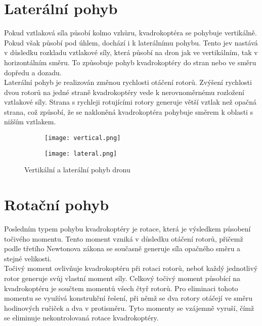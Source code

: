 \documentclass[12pt]{report}
\begin{document}
\section[Laterální pohyb]{Laterální pohyb}
Pokud vztlaková síla působí kolmo vzhůru, kvadrokoptéra se pohybuje vertikálně. Pokud však působí pod úhlem, dochází i k laterálnímu pohybu. Tento jev nastává v důsledku rozkladu vztlakové síly, která působí na dron jak ve vertikálním, tak v horizontálním směru. To způsobuje pohyb kvadrokoptéry do stran nebo ve směru dopředu a dozadu.\\
Laterální pohyb je realizován změnou rychlosti otáčení rotorů. Zvýšení rychlosti dvou rotorů na jedné straně kvadrokoptéry vede k nerovnoměrnému rozložení vztlakové síly. Strana s rychleji rotujícími rotory generuje větší vztlak než opačná strana, což způsobí, že se nakloněná kvadrokoptéra pohybuje směrem k oblasti s nižším vztlakem.

\begin{figure}[H]
    \begin{subfigure}{0.45\linewidth}
        \centering
        \texttt{[image: vertical.png]}
    \end{subfigure}
    \hfill
    \begin{subfigure}{0.45\linewidth}
        \texttt{[image: lateral.png]}
    \end{subfigure}
    \caption{Vertikální a laterální pohyb dronu \cite{nasa}}
    \label{fig:batteries}
\end{figure}

\section[Rotační pohyb]{Rotační pohyb}
Posledním typem pohybu kvadrokoptéry je rotace, která je výsledkem působení točivého momentu. Tento moment vzniká v důsledku otáčení rotorů, přičemž podle třetího Newtonova zákona se současně generuje síla opačného směru a stejné velikosti.\\
Točivý moment ovlivňuje kvadrokoptéru při rotaci rotorů, neboť každý jednotlivý rotor generuje svůj vlastní moment síly. Celkový točivý moment působící na kvadrokoptéru je součtem momentů všech čtyř rotorů. Pro eliminaci tohoto momentu se využívá konstrukční řešení, při němž se dva rotory otáčejí ve směru hodinových ručiček a dva v protisměru. Tyto momenty se vzájemně vyruší, čímž se eliminuje nekontrolovaná rotace kvadrokoptéry.\\
\end{document}
